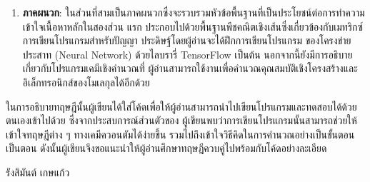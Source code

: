 {\begin{enumerate}[topsep=0pt]
    \item \textbf{ภาคผนวก}: ในส่วนที่สามเป็นภาคผนวกซึ่งจะรวบรวมหัวข้อพื้นฐานที่เป็นประโยชน์ต่อการทำความเข้าใจเนื้อหาหลักในสองส่วน%
    แรก ประกอบไปด้วยพื้นฐานพีชคณิตเชิงเส้นซึ่งเกี่ยวข้องกับเมทริกซ์ การเขียนโปรแกรมสำหรับปัญญา ประดิษฐ์โดยผู้อ่านจะได้ฝึกการเขียนโปรแกรม%
    ของโครงข่ายประสาท (Neural Network) ด้วยไลบรารี่ TensorFlow เป็นต้น นอกจากนี้ยังมีการอธิบายเกี่ยวกับโปรแกรมเคมีเชิงคำนวณที่%
    ผู้อ่านสามารถใช้งานเพื่อคำนวณคุณสมบัติเชิงโครงสร้างและอิเล็กทรอนิกส์ของโมเลกุลได้อีกด้วย
\end{enumerate}

ในการอธิบายทฤษฎีนั้นผู้เขียนได้ใส่โค้ดเพื่อให้ผู้อ่านสามารถนำไปเขียนโปรแกรมและทดสอบได้ด้วยตนเองเข้าไปด้วย ซึ่งจากประสบการณ์ส่วนตัวของ%
ผู้เขียนพบว่าการเขียนโปรแกรมนั้นสามารถช่วยให้เข้าใจทฤษฎีต่าง ๆ ทางเคมีควอนตัมได้ง่ายขึ้น รวมไปถึงเข้าใจวิธีคิดในการคำนวณอย่างเป็นขั้นตอน%
เป็นตอน ดังนั้นผู้เขียนจึงขอแนะนำให้ผู้อ่านศึกษาทฤษฎีควบคู่ไปพร้อมกับโค้ดอย่างละเอียด

\medskip

\begin{flushright}
รังสิมันต์ เกษแก้ว
\end{flushright}
}

